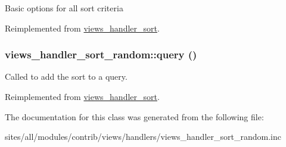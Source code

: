 Basic options for all sort criteria 

Reimplemented from \hyperlink{classviews__handler__sort_ba953218e09ab9da8f6ed0a67f046455}{views\_\-handler\_\-sort}.\hypertarget{classviews__handler__sort__random_eaf6fcc03c9d1a0f86a77b9e5314229a}{
\subsubsection[{query}]{\setlength{\rightskip}{0pt plus 5cm}views\_\-handler\_\-sort\_\-random::query ()}}
\label{classviews__handler__sort__random_eaf6fcc03c9d1a0f86a77b9e5314229a}


Called to add the sort to a query. 

Reimplemented from \hyperlink{classviews__handler__sort_94fa33c5d037e41a927583fce2df3d18}{views\_\-handler\_\-sort}.

The documentation for this class was generated from the following file:\begin{CompactItemize}
\item 
sites/all/modules/contrib/views/handlers/views\_\-handler\_\-sort\_\-random.inc\end{CompactItemize}
